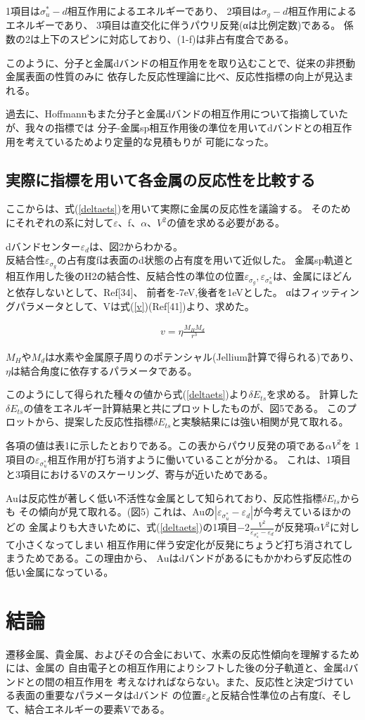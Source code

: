 \documentclass[12pt]{ltjsarticle}
\begin{document}
1項目は$\sigma _u ^* -d$相互作用によるエネルギーであり、
2項目は$\sigma _g -d$相互作用によるエネルギーであり、
3項目は直交化に伴うパウリ反発(αは比例定数)である。
係数の2は上下のスピンに対応しており、(1-f)は非占有度合である。

このように、分子と金属dバンドの相互作用をを取り込むことで、従来の非摂動金属表面の性質のみに
依存した反応性理論に比べ、反応性指標の向上が見込まれる。

過去に、Hoffmannもまた分子と金属dバンドの相互作用について指摘していたが、我々の指標では
分子-金属sp相互作用後の準位を用いてdバンドとの相互作用を考えているためより定量的な見積もりが
可能になった。

\subsection{実際に指標を用いて各金属の反応性を比較する}
ここからは、式(\ref{deltaets})を用いて実際に金属の反応性を議論する。
そのためにそれぞれの系に対して$\varepsilon$、f、$\alpha$、$V^2$の値を求める必要がある。

dバンドセンター$\varepsilon_d$は、図2からわかる。\\
反結合性$\varepsilon _{\sigma_g}$の占有度fは表面のd状態の占有度を用いて近似した。
金属sp軌道と相互作用した後のH2の結合性、反結合性の準位の位置$\varepsilon _{\sigma_g},
\varepsilon _{\sigma_u^*}$は、金属にほどんと依存しないとして、Ref[34]、
前者を-7eV,後者を1eVとした。
αはフィッティングパラメータとして、Vは式(\ref{v})(Ref[41])より、求めた。

\begin{eqnarray}
    \label{v}
    v = \eta \frac{ M_H M_d }{r^3}
\end{eqnarray}

$M_H$や$M_d$は水素や金属原子周りのポテンシャル(Jellium計算で得られる)であり、
$\eta$は結合角度に依存するパラメータである。

このようにして得られた種々の値から式(\ref{deltaets})より$\delta E_{ts}$を求める。
計算した$\delta E_{ts}$の値をエネルギー計算結果と共にプロットしたものが、図5である。
このプロットから、提案した反応性指標$\delta E_{ts}$と実験結果には強い相関が見て取れる。

各項の値は表1に示したとおりである。この表からパウリ反発の項である$\alpha V^2$を
1項目の$\varepsilon _{\sigma_u^*}$相互作用が打ち消すように働いていることが分かる。
これは、1項目と3項目におけるVのスケーリング、寄与が近いためである。

Auは反応性が著しく低い不活性な金属として知られており、反応性指標$\delta E_{ts}$からも
その傾向が見て取れる。(図5)
これは、Auの$| \varepsilon _{\sigma_u^*} - \varepsilon _d|$が今考えているほかのどの
金属よりも大きいために、式(\ref{deltaets})の1項目$-2 \frac{ V^2 }{\varepsilon _
{\sigma_u^*} - \varepsilon _d}$が反発項$\alpha V^2$に対して小さくなってしまい
相互作用に伴う安定化が反発にちょうど打ち消されてしまうためである。この理由から、
Auはdバンドがあるにもかかわらず反応性の低い金属になっている。

\section{結論}
遷移金属、貴金属、およびその合金において、水素の反応性傾向を理解するためには、金属の
自由電子との相互作用によりシフトした後の分子軌道と、金属dバンドとの間の相互作用を
考えなければならない。また、反応性と決定づけている表面の重要なパラメータはdバンド
の位置$\varepsilon_d$と反結合性準位の占有度f、そして、結合エネルギーの要素Vである。
\end{document}
